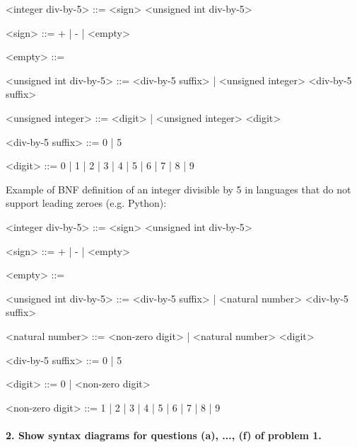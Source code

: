 \documentclass{article}
\begin{document}
	\ttfamily
	\begin{grammar}
	
		<integer div-by-5> ::= <sign> <unsigned int div-by-5>
		
		<sign> ::= + | - | <empty>
		
		<empty> ::= \
		
		<unsigned int div-by-5> ::= <div-by-5 suffix> | <unsigned integer> <div-by-5 suffix>
	
		<unsigned integer> ::= <digit> | <unsigned integer> <digit>
		
		<div-by-5 suffix> ::= 0 | 5

		<digit> ::= 0 | 1 | 2 | 3 | 4 | 5 | 6 | 7 | 8 | 9
		
	\end{grammar}
	
		\rmfamily
	
		Example of BNF definition of an integer divisible by 5 in languages that do not support leading zeroes (e.g. Python):
		
	\ttfamily
	\begin{grammar}
	
		<integer div-by-5> ::= <sign> <unsigned int div-by-5>
		
		<sign> ::= + | - | <empty>
		
		<empty> ::= \
		
		<unsigned int div-by-5> ::= <div-by-5 suffix> | <natural number> <div-by-5 suffix>
		
		<natural number> ::= <non-zero digit> | <natural number> <digit>
		
		<div-by-5 suffix> ::= 0 | 5
		
		<digit> ::= 0 | <non-zero digit>
		
		<non-zero digit> ::= 1 | 2 | 3 | 4 | 5 | 6 | 7 | 8 | 9
		
	\end{grammar}
	
	
	
	
	
	\paragraph{2. Show syntax diagrams for questions (a), ..., (f) of problem 1.}
	
\end{document}
